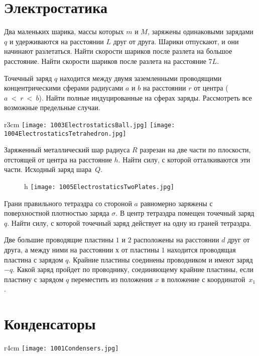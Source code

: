 \section{Электростатика}

\AddProb Два маленьких шарика, массы которых $m$ и $M$, заряжены одинаковыми зарядами $q$ и удерживаются на расстоянии $L$ друг от друга. 
Шарики отпускают, и они начинают разлетаться. Найти скорости шариков после разлета на большое расстояние. 
Найти скорости шариков после разлета на расстояние $7L$.

\AddProb Точечный заряд $q$ находится между двумя заземленными проводящими концентрическими сферами 
радиусами $a$ и $b$ на расстоянии $r$ от центра ($a~<~r~<~b$). 
Найти полные индуцированные на сферах заряды. Рассмотреть все возможные предельные случаи.

\begin{wrapfigure}{r}{3cm}
\texttt{[image: 1003ElectrostaticsBall.jpg]}
\texttt{[image: 1004ElectrostaticsTetrahedron.jpg]}
\end{wrapfigure}

\AddProb Заряженный металлический шар радиуса $R$ разрезан на две части по плоскости, отстоящей от центра на расстояние $h$. 
Найти силу, с которой отталкиваются эти части. Исходный заряд шара~$Q$.

\begin{figure}{h}
\texttt{[image: 1005ElectrostaticsTwoPlates.jpg]}
\end{figure}

\AddProb Грани правильного тетраэдра со стороной $a$ равномерно заряжены с поверхностной плотностью заряда $\sigma$. 
В центр тетраэдра помещен точечный заряд $q$. Найти силу, с которой точечный заряд действует на одну из граней тетраэдра.

\AddProb Две большие проводящие пластины $1$ и $2$ расположены на расстоянии $d$ друг от друга, 
а между ними на расстоянии $х$ от пластины $1$ находится проводящая пластина с зарядом $q$. 
Крайние пластины соединены проводником и имеют заряд $-q$. 
Какой заряд пройдет по проводнику, соединяющему крайние пластины, если пластину с зарядом $q$ переместить из положения $x$ в положение с координатой~$x_1$.


\section{Конденсаторы}

\begin{wrapfigure}{r}{4cm}
\texttt{[image: 1001Condensers.jpg]}
\end{wrapfigure}

